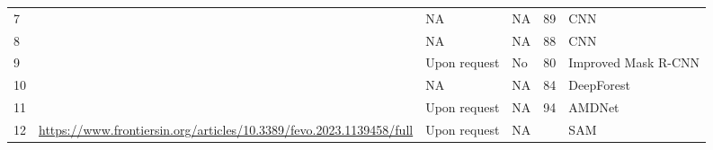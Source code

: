 \documentclass[9pt,lineno]{elife}
\begin{document}
\begin{table}[]
\begin{fullwidth}
\begin{tabular}{p{1cm}p{4cm}p{4cm}p{4cm}p{1cm}p{2cm}}
7  & \cite{Schiefer_Kattenborn_Frick_Frey_Schall_Koch_Schmidtlein_2020}                                                                                         & NA                                                                            & NA                                                                                                                              & 89               & CNN                 \\
8  & \cite{Egli_Hopke_2020}                                                                                                               & NA                                                                            & NA                                                                                                                              & 88               & CNN                 \\
9  & \cite{Zhang_Zhou_Wang_Tan_Cui_Huang_Wang_Zhang_2022}                                                                                                                  & Upon request                                                                  & No                                                                                                                              & 80               & Improved Mask R-CNN \\
10 & \cite{Sivanandam_Lucieer_2022}                                                                                                                & NA                                                                            & NA                                                                                                                              & 84               & DeepForest          \\
11 & \cite{Huang_Li_Fan_Chen_Yang_Lu_Sheng_Pu_Zhu_2023}                                                                                                                    & Upon request                                                                  & NA                                                                                                                              & 94               & AMDNet              \\
12 & \url{https://www.frontiersin.org/articles/10.3389/fevo.2023.1139458/full}                                                                                        & Upon request                                                                  & NA                                                                                                                              &                  & SAM                 \\

\end{tabular}
\end{fullwidth}
\end{table}
\end{document}

